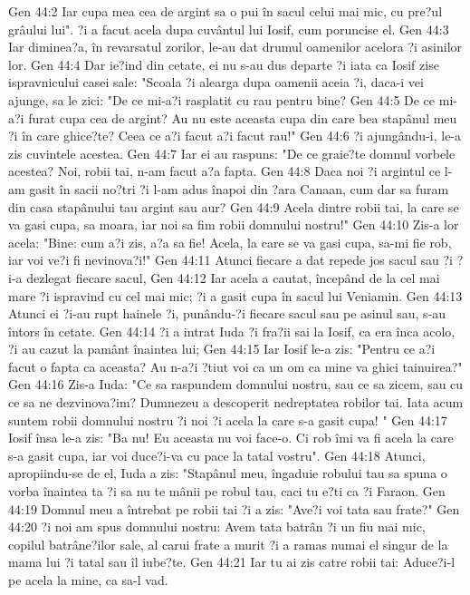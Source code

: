 Gen 44:2  Iar cupa mea cea de argint sa o pui în sacul celui mai mic, cu pre?ul grâului lui". ?i a facut acela dupa cuvântul lui Iosif, cum poruncise el.
Gen 44:3  Iar diminea?a, în revarsatul zorilor, le-au dat drumul oamenilor acelora ?i asinilor lor.
Gen 44:4  Dar ie?ind din cetate, ei nu s-au dus departe ?i iata ca Iosif zise ispravnicului casei sale: "Scoala ?i alearga dupa oamenii aceia ?i, daca-i vei ajunge, sa le zici: "De ce mi-a?i rasplatit cu rau pentru bine?
Gen 44:5  De ce mi-a?i furat cupa cea de argint? Au nu este aceasta cupa din care bea stapânul meu ?i în care ghice?te? Ceea ce a?i facut a?i facut rau!"
Gen 44:6  ?i ajungându-i, le-a zis cuvintele acestea.
Gen 44:7  Iar ei au raspuns: "De ce graie?te domnul vorbele acestea? Noi, robii tai, n-am facut a?a fapta.
Gen 44:8  Daca noi ?i argintul ce l-am gasit în sacii no?tri ?i l-am adus înapoi din ?ara Canaan, cum dar sa furam din casa stapânului tau argint sau aur?
Gen 44:9  Acela dintre robii tai, la care se va gasi cupa, sa moara, iar noi sa fim robii domnului nostru!"
Gen 44:10  Zis-a lor acela: "Bine: cum a?i zis, a?a sa fie! Acela, la care se va gasi cupa, sa-mi fie rob, iar voi ve?i fi nevinova?i!"
Gen 44:11  Atunci fiecare a dat repede jos sacul sau ?i ?i-a dezlegat fiecare sacul,
Gen 44:12  Iar acela a cautat, începând de la cel mai mare ?i ispravind cu cel mai mic; ?i a gasit cupa în sacul lui Veniamin.
Gen 44:13  Atunci ei ?i-au rupt hainele ?i, punându-?i fiecare sacul sau pe asinul sau, s-au întors în cetate.
Gen 44:14  ?i a intrat Iuda ?i fra?ii sai la Iosif, ca era înca acolo, ?i au cazut la pamânt înaintea lui;
Gen 44:15  Iar Iosif le-a zis: "Pentru ce a?i facut o fapta ca aceasta? Au n-a?i ?tiut voi ca un om ca mine va ghici tainuirea?"
Gen 44:16  Zis-a Iuda: "Ce sa raspundem domnului nostru, sau ce sa zicem, sau cu ce sa ne dezvinova?im? Dumnezeu a descoperit nedreptatea robilor tai. Iata acum suntem robii domnului nostru ?i noi ?i acela la care s-a gasit cupa! "
Gen 44:17  Iosif însa le-a zis: "Ba nu! Eu aceasta nu voi face-o. Ci rob îmi va fi acela la care s-a gasit cupa, iar voi duce?i-va cu pace la tatal vostru".
Gen 44:18  Atunci, apropiindu-se de el, Iuda a zis: "Stapânul meu, îngaduie robului tau sa spuna o vorba înaintea ta ?i sa nu te mânii pe robul tau, caci tu e?ti ca ?i Faraon.
Gen 44:19  Domnul meu a întrebat pe robii tai ?i a zis: "Ave?i voi tata sau frate?"
Gen 44:20  ?i noi am spus domnului nostru: Avem tata batrân ?i un fiu mai mic, copilul batrâne?ilor sale, al carui frate a murit ?i a ramas numai el singur de la mama lui ?i tatal sau îl iube?te.
Gen 44:21  Iar tu ai zis catre robii tai: Aduce?i-l pe acela la mine, ca sa-l vad.
